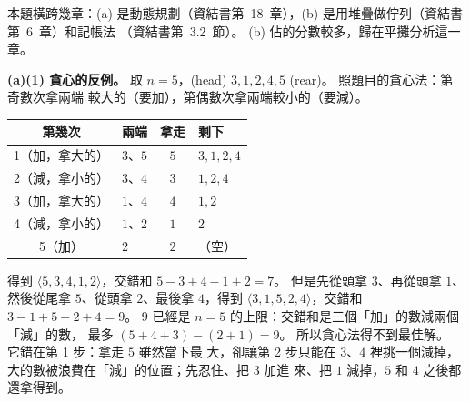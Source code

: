 \begin{pastsoln}
本題橫跨幾章：(a) 是動態規劃（資結書第~18~章），(b) 是用堆疊做佇列（資結書第~6~章）和記帳法
（資結書第~3.2~節）。 (b) 佔的分數較多，歸在平攤分析這一章。

\textbf{(a)(1) 貪心的反例。} 取 $n = 5$，(head) $3, 1, 2, 4, 5$ (rear)。 照題目的貪心法：第奇數次拿兩端
較大的（要加），第偶數次拿兩端較小的（要減）。
\begin{center}
\small
\begin{tabular}{clcl}
\toprule
第幾次 & 兩端 & 拿走 & 剩下 \\
\midrule
1（加，拿大的） & $3$、$5$ & $5$ & $3, 1, 2, 4$ \\
2（減，拿小的） & $3$、$4$ & $3$ & $1, 2, 4$ \\
3（加，拿大的） & $1$、$4$ & $4$ & $1, 2$ \\
4（減，拿小的） & $1$、$2$ & $1$ & $2$ \\
5（加） & $2$ & $2$ & （空） \\
\bottomrule
\end{tabular}
\end{center}
得到 $\langle 5, 3, 4, 1, 2\rangle$，交錯和 $5 - 3 + 4 - 1 + 2 = 7$。 但是先從頭拿 $3$、再從頭拿 $1$、
然後從尾拿 $5$、從頭拿 $2$、最後拿 $4$，得到 $\langle 3, 1, 5, 2, 4\rangle$，交錯和
$3 - 1 + 5 - 2 + 4 = 9$。 $9$ 已經是 $n = 5$ 的上限：交錯和是三個「加」的數減兩個「減」的數，
最多 $(5 + 4 + 3) - (2 + 1) = 9$。 所以貪心法得不到最佳解。 它錯在第 1 步：拿走 $5$ 雖然當下最
大，卻讓第 2 步只能在 $3$、$4$ 裡挑一個減掉，大的數被浪費在「減」的位置；先忍住、把 $3$ 加進
來、把 $1$ 減掉，$5$ 和 $4$ 之後都還拿得到。


\end{pastsoln}
